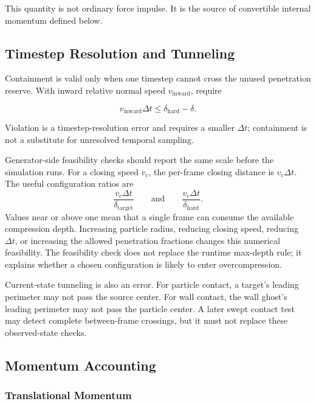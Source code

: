 This quantity is not ordinary force impulse.  It is the source of convertible
internal momentum defined below.

\subsection{Timestep Resolution and Tunneling}

Containment is valid only when one timestep cannot cross the unused
penetration reserve.  With inward relative normal speed
\(v_{\mathrm{inward}}\), require

\begin{equation}
v_{\mathrm{inward}}\Delta t
\leq\delta_{\mathrm{hard}}-\delta.
\end{equation}

Violation is a timestep-resolution error and requires a smaller
\(\Delta t\); containment is not a substitute for unresolved temporal
sampling.

Generator-side feasibility checks should report the same scale before the
simulation runs.  For a closing speed \(v_c\), the per-frame closing distance
is \(v_c\Delta t\).  The useful configuration ratios are
\[
    \frac{v_c\Delta t}{\delta_{\mathrm{target}}}
    \qquad\mathrm{and}\qquad
    \frac{v_c\Delta t}{\delta_{\mathrm{hard}}}.
\]
Values near or above one mean that a single frame can consume the available
compression depth.  Increasing particle radius, reducing closing speed,
reducing \(\Delta t\), or increasing the allowed penetration fractions changes
this numerical feasibility.  The feasibility check does not replace the
runtime max-depth rule; it explains whether a chosen configuration is likely
to enter overcompression.

Current-state tunneling is also an error.  For particle contact, a target's
leading perimeter may not pass the source center.  For wall contact, the wall
ghost's leading perimeter may not pass the particle center.  A later swept
contact test may detect complete between-frame crossings, but it must not
replace these observed-state checks.

\subsection{Momentum Accounting}

\subsubsection{Translational Momentum}

